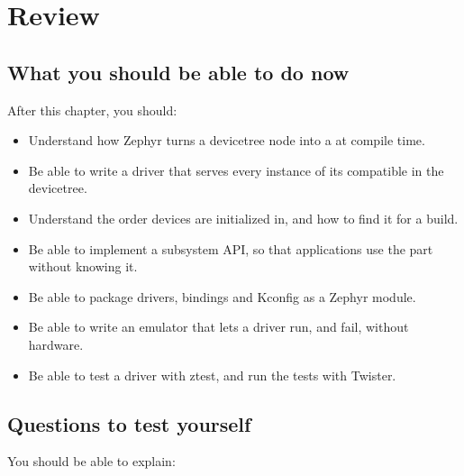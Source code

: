 
\section{Review}
\label{c5:sec:review}

\subsection*{What you should be able to do now}
After this chapter, you should:

\begin{itemize}
  \item Understand how Zephyr turns a devicetree node into a  at compile time.
  \item Be able to write a driver that serves every instance of its compatible in the devicetree.
  \item Understand the order devices are initialized in, and how to find it for a build.
  \item Be able to implement a subsystem API, so that applications use the part without knowing it.
  \item Be able to package drivers, bindings and Kconfig as a Zephyr module.
  \item Be able to write an emulator that lets a driver run, and fail, without hardware.
  \item Be able to test a driver with ztest, and run the tests with Twister.
\end{itemize}

\subsection*{Questions to test yourself}
You should be able to explain:

